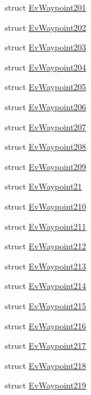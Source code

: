 \begin{DoxyCompactItemize}
\item 
struct \hyperlink{structmove__base__z__client_1_1EvWaypoint201}{Ev\+Waypoint201}
\item 
struct \hyperlink{structmove__base__z__client_1_1EvWaypoint202}{Ev\+Waypoint202}
\item 
struct \hyperlink{structmove__base__z__client_1_1EvWaypoint203}{Ev\+Waypoint203}
\item 
struct \hyperlink{structmove__base__z__client_1_1EvWaypoint204}{Ev\+Waypoint204}
\item 
struct \hyperlink{structmove__base__z__client_1_1EvWaypoint205}{Ev\+Waypoint205}
\item 
struct \hyperlink{structmove__base__z__client_1_1EvWaypoint206}{Ev\+Waypoint206}
\item 
struct \hyperlink{structmove__base__z__client_1_1EvWaypoint207}{Ev\+Waypoint207}
\item 
struct \hyperlink{structmove__base__z__client_1_1EvWaypoint208}{Ev\+Waypoint208}
\item 
struct \hyperlink{structmove__base__z__client_1_1EvWaypoint209}{Ev\+Waypoint209}
\item 
struct \hyperlink{structmove__base__z__client_1_1EvWaypoint21}{Ev\+Waypoint21}
\item 
struct \hyperlink{structmove__base__z__client_1_1EvWaypoint210}{Ev\+Waypoint210}
\item 
struct \hyperlink{structmove__base__z__client_1_1EvWaypoint211}{Ev\+Waypoint211}
\item 
struct \hyperlink{structmove__base__z__client_1_1EvWaypoint212}{Ev\+Waypoint212}
\item 
struct \hyperlink{structmove__base__z__client_1_1EvWaypoint213}{Ev\+Waypoint213}
\item 
struct \hyperlink{structmove__base__z__client_1_1EvWaypoint214}{Ev\+Waypoint214}
\item 
struct \hyperlink{structmove__base__z__client_1_1EvWaypoint215}{Ev\+Waypoint215}
\item 
struct \hyperlink{structmove__base__z__client_1_1EvWaypoint216}{Ev\+Waypoint216}
\item 
struct \hyperlink{structmove__base__z__client_1_1EvWaypoint217}{Ev\+Waypoint217}
\item 
struct \hyperlink{structmove__base__z__client_1_1EvWaypoint218}{Ev\+Waypoint218}
\item 
struct \hyperlink{structmove__base__z__client_1_1EvWaypoint219}{Ev\+Waypoint219}
\item 

\end{DoxyCompactItemize}
